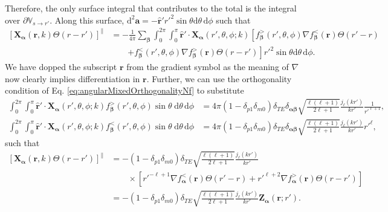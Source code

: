 Therefore, the only surface integral that contributes to the total is the integral over $\partial\mathbb{V}_{s\to r'}$. Along this surface, $\mathrm{d}^2\mathbf{a} = -\hat{\mathbf{r}}'r'^2\sin\theta\mathrm{d}\theta\,\mathrm{d}\phi$ such that
\begin{equation}
\begin{split}
\left[\mathbf{X}_{\bm{\alpha}}(\mathbf{r},k)\Theta(r - r')\right]^\parallel &= 
-\frac{1}{4\pi}\sum_{\bm{\beta}} \int_0^{2\pi}\int_0^\pi\hat{\mathbf{r}}'\cdot\mathbf{X}_{\bm{\alpha}}(r',\theta,\phi;k) \left[f_{\bm{\beta}}^>(r',\theta,\phi)\nabla f_{\bm{\beta}}^<(\mathbf{r})\Theta(r' - r)\right.\\
&\qquad\left.+ f_{\bm{\beta}}^<(r',\theta,\phi)\nabla f_{\bm{\beta}}^>(\mathbf{r})\Theta(r - r')\right]r'^2\sin\theta\mathrm{d}\theta\,\mathrm{d}\phi.
\end{split}
\end{equation}
We have dopped the subscript $\mathbf{r}$ from the gradient symbol as the meaning of $\nabla$ now clearly implies differentiation in $\mathbf{r}$. Further, we can use the orthogonality condition of Eq. \eqref{eq:angularMixedOrthogonalityNf} to substitute
\begin{equation}
\begin{split}
\int_0^{2\pi}\int_0^\pi\hat{\mathbf{r}}'\cdot\mathbf{X}_{\bm{\alpha}}(r',\theta,\phi;k)f_{\bm{\beta}}^>(r',\theta,\phi)\sin\theta\;\mathrm{d}\theta\,\mathrm{d}\phi &= 4\pi(1 - \delta_{p1}\delta_{m0})\delta_{TE}\delta_{\bm{\alpha}\bm{\beta}}\sqrt{\frac{\ell(\ell + 1)}{2\ell + 1}}\frac{j_\ell(kr')}{kr'}\frac{1}{r'^{\ell + 1}},\\
\int_0^{2\pi}\int_0^\pi\hat{\mathbf{r}}'\cdot\mathbf{X}_{\bm{\alpha}}(r',\theta,\phi;k)f_{\bm{\beta}}^<(r',\theta,\phi)\sin\theta\;\mathrm{d}\theta\,\mathrm{d}\phi &= 4\pi(1 - \delta_{p1}\delta_{m0})\delta_{TE}\delta_{\bm{\alpha}\bm{\beta}}\sqrt{\frac{\ell(\ell + 1)}{2\ell + 1}}\frac{j_\ell(kr')}{kr'}r'^\ell,
\end{split}
\end{equation}
such that
\begin{equation}
\begin{split}
\left[\mathbf{X}_{\bm{\alpha}}(\mathbf{r},k)\Theta(r - r')\right]^\parallel &= -(1 - \delta_{p1}\delta_{m0})\delta_{TE}\sqrt{\frac{\ell(\ell + 1)}{2\ell + 1}}\frac{j_\ell(kr')}{kr'}\\
&\qquad\times\left[r'^{-\ell + 1}\nabla f_{\bm{\alpha}}^<(\mathbf{r})\Theta(r' - r) + r'^{\ell + 2}\nabla f_{\bm{\alpha}}^>(\mathbf{r})\Theta(r - r')\right]\\[0.5em]
&= -(1 - \delta_{p1}\delta_{m0})\delta_{TE}\sqrt{\frac{\ell(\ell + 1)}{2\ell + 1}}\frac{j_\ell(kr')}{kr'}\mathbf{Z}_{\bm{\alpha}}(\mathbf{r};r').
\end{split}
\end{equation}


